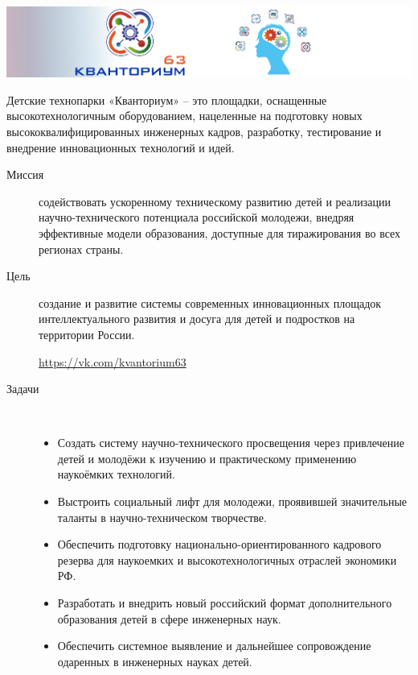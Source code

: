 \clearpage\noindent\includegraphics[width=\textwidth]{img/logo63.png}


\noindent
Детские технопарки «Кванториум» – это площадки, оснащенные высокотехнологичным
оборудованием, нацеленные на подготовку новых высококвалифицированных инженерных
кадров, разработку, тестирование и внедрение инновационных технологий и идей.

\clearpage

\begin{description}

\item[Миссия] содействовать ускоренному техническому развитию детей и реализации
научно-технического потенциала российской молодежи, внедряя эффективные модели
образования, доступные для тиражирования во всех регионах страны.

\item[Цель] создание и развитие системы современных инновационных площадок
интеллектуального развития и досуга для детей и подростков на территории России.

\bigskip
\url{https://vk.com/kvantorium63}

\clearpage
\item[Задачи]\ \\

\begin{itemize}[nosep]
  \item 
Создать систему научно-технического просвещения через привлечение детей и
молодёжи к изучению и практическому применению наукоёмких технологий.
  \item 
Выстроить социальный лифт для молодежи, проявившей значительные таланты в
научно-техническом творчестве.
  \item 
Обеспечить подготовку национально-ориентированного кадрового резерва для
наукоемких и высокотехнологичных отраслей экономики РФ.
  \item 
Разработать и внедрить новый российский формат дополнительного образования детей
в сфере инженерных наук.
  \item 
Обеспечить системное выявление и дальнейшее сопровождение одаренных в инженерных
науках детей.
\end{itemize}
 
\end{description}


